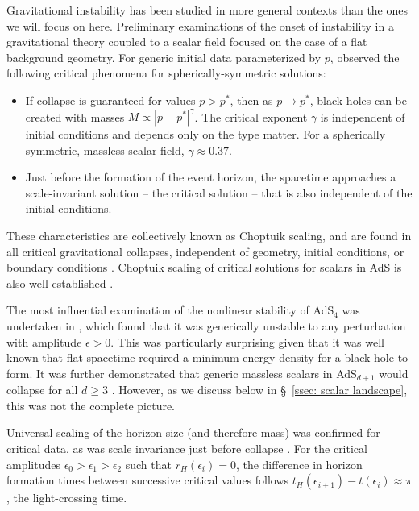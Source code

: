 \documentclass[../PhD.tex]{subfiles}
\begin{document}
Gravitational instability has been studied in more general contexts than the ones we will focus on here. Preliminary examinations of the onset of instability in a gravitational theory coupled to a scalar field focused on the case of a flat background geometry. For generic initial data parameterized by $p$,  \cite{Choptuik:1992jv} observed the following critical phenomena for spherically-symmetric solutions:
\begin{itemize}
\item If collapse is guaranteed for values $p > p^*$, then as $p \to p^*$, black holes can be created with masses $M \propto |p - p^*|^\gamma$. The critical exponent $\gamma$ is independent of initial conditions and depends only on the type matter. For a spherically symmetric, massless scalar field, $\gamma \approx 0.37$.
\item Just before the formation of the event horizon, the spacetime approaches a scale-invariant solution -- the critical solution -- that is also independent of the initial conditions.
\end{itemize}
These characteristics are collectively known as Choptuik scaling, and are found in all critical gravitational collapses, independent of geometry, initial conditions, or boundary conditions \cite{gr-qc/0210101, 1208.2934, 1210.0890}. Choptuik scaling of critical solutions for scalars in AdS is also well established \cite{gr-qc/0109002, hep-th/0101194}. 

The most influential examination of the nonlinear stability of AdS$_4$ was undertaken in \cite{1104.3702}, which found that it was generically unstable to any perturbation with amplitude $\epsilon > 0$. This was particularly surprising given that it was well known that flat spacetime required a minimum energy density for a black hole to form. It was further demonstrated that generic massless scalars in AdS$_{d+1}$ would collapse for all $d \geq 3$ \cite{1106.2339, 1108.4539}.  However, as we discuss below in \S\!~\ref{ssec: scalar landscape}, this was not the complete picture.

Universal scaling of the horizon size (and therefore mass) was confirmed for critical data, as was scale invariance just before collapse \cite{1110.5823}. For the critical amplitudes {$\epsilon_0 > \epsilon_1 > \epsilon_2$} such that $r_H(\epsilon_i) = 0$, the difference in horizon formation times between successive critical values follows {$t_H(\epsilon_{i+1}) - t(\epsilon_i) \approx \pi$}, the light-crossing time.

\end{document}
